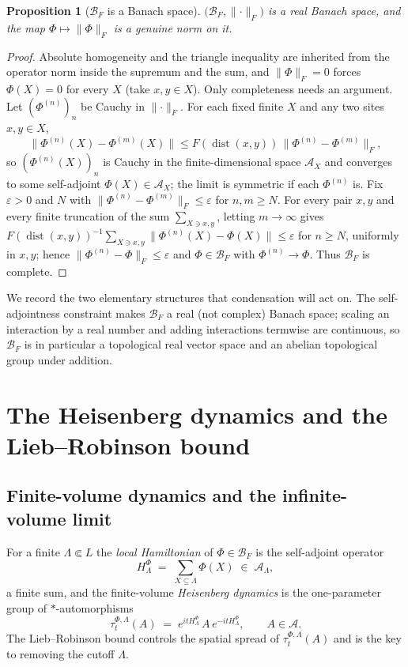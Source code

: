 \documentclass[12pt]{article}
\newcommand{\Ffun}{F}                          %
\newcommand{\BF}{\mathcal{B}_{F}}              %
\newcommand{\qA}{\mathcal{A}}
\newcommand{\norm}[1]{\lVert #1\rVert}
\newcommand{\Fnorm}[1]{\lVert #1\rVert_{F}}
\newcommand{\dist}{\operatorname{dist}}
\newtheorem{proposition}[theorem]{Proposition}
\theoremstyle{definition}
\theoremstyle{remark}
\begin{document}
\begin{proposition}[$\BF$ is a Banach space]
\label{prop:banach-space}
$\bigl(\BF,\Fnorm{\cdot}\bigr)$ is a real Banach space, and the map
$\Phi\mapsto\Fnorm{\Phi}$ is a genuine norm on it.
\end{proposition}
\begin{proof}
Absolute homogeneity and the triangle inequality are inherited from the operator norm inside
the supremum and the sum, and $\Fnorm{\Phi}=0$ forces $\Phi(X)=0$ for every $X$ (take
$x,y\in X$). Only completeness needs an argument. Let $(\Phi^{(n)})_n$ be Cauchy in
$\Fnorm{\cdot}$. For each fixed finite $X$ and any two sites $x,y\in X$,
\[
  \norm{\Phi^{(n)}(X)-\Phi^{(m)}(X)}
  \le \Ffun(\dist(x,y))\,\Fnorm{\Phi^{(n)}-\Phi^{(m)}},
\]
so $(\Phi^{(n)}(X))_n$ is Cauchy in the finite-dimensional space $\qA_X$ and converges to some
self-adjoint $\Phi(X)\in\qA_X$; the limit is symmetric if each $\Phi^{(n)}$ is. Fix
$\varepsilon>0$ and $N$ with $\Fnorm{\Phi^{(n)}-\Phi^{(m)}}\le\varepsilon$ for $n,m\ge N$. For
every pair $x,y$ and every finite truncation of the sum $\sum_{X\ni x,y}$, letting
$m\to\infty$ gives
$\Ffun(\dist(x,y))^{-1}\sum_{X\ni x,y}\norm{\Phi^{(n)}(X)-\Phi(X)}\le\varepsilon$ for $n\ge N$,
uniformly in $x,y$; hence $\Fnorm{\Phi^{(n)}-\Phi}\le\varepsilon$ and $\Phi\in\BF$ with
$\Phi^{(n)}\to\Phi$. Thus $\BF$ is complete.
\end{proof}

We record the two elementary structures that condensation will act on. The self-adjointness
constraint makes $\BF$ a real (not complex) Banach space; scaling an interaction by a real
number and adding interactions termwise are continuous, so $\BF$ is in particular a
topological real vector space and an abelian topological group under addition.

\section{The Heisenberg dynamics and the Lieb--Robinson bound}
\label{sec:lr}

\subsection{Finite-volume dynamics and the infinite-volume limit}
\label{sec:lr-dynamics}

For a finite $\Lambda\Subset L$ the \emph{local Hamiltonian} of $\Phi\in\BF$ is the
self-adjoint operator
\[
  H^\Phi_\Lambda \;=\; \sum_{X\subseteq\Lambda}\Phi(X)\;\in\;\qA_\Lambda,
\]
a finite sum, and the finite-volume \emph{Heisenberg dynamics} is the one-parameter group of
$*$-automorphisms
\[
  \tau^{\Phi,\Lambda}_t(A)\;=\;e^{itH^\Phi_\Lambda}\,A\,e^{-itH^\Phi_\Lambda},\qquad A\in\qA.
\]
The Lieb--Robinson bound controls the spatial spread of $\tau^{\Phi,\Lambda}_t(A)$ and is the
key to removing the cutoff $\Lambda$.
\end{document}
